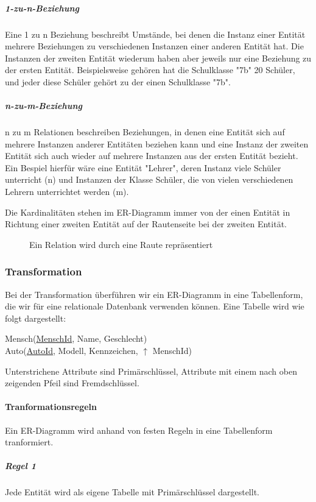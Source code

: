 \documentclass{article}
\begin{document}
	\subparagraph{1-zu-n-Beziehung}
	Eine 1 zu n Beziehung beschreibt Umstände, bei denen die Instanz einer Entität mehrere Beziehungen zu verschiedenen Instanzen einer anderen Entität hat. Die Instanzen der zweiten Entität wiederum haben aber jeweils nur eine Beziehung zu der ersten Entität. Beispielsweise gehören hat die Schulklasse "7b" 20 Schüler, und jeder diese Schüler gehört zu der einen Schulklasse "7b".

	\subparagraph{n-zu-m-Beziehung}
	n zu m Relationen beschreiben Beziehungen, in denen eine Entität sich auf mehrere Instanzen anderer Entitäten beziehen kann und eine Instanz der zweiten Entität sich auch wieder auf mehrere Instanzen aus der ersten Entität bezieht. Ein Bespiel hierfür wäre eine Entität "Lehrer", deren Instanz viele Schüler unterricht (n) und Instanzen der Klasse Schüler, die von vielen verschiedenen Lehrern unterrichtet werden (m).

	Die Kardinalitäten stehen im ER-Diagramm immer von der einen Entität in Richtung einer zweiten Entität auf der Rautenseite bei der zweiten Entität.

	\begin{figure}[h!]
		\centering
		
		\caption{Ein Relation wird durch eine Raute repräsentiert}
	\end{figure}

	\subsubsection{Transformation}
	Bei der Transformation überführen wir ein ER-Diagramm in eine Tabellenform, die wir für eine relationale Datenbank verwenden können.
	Eine Tabelle wird wie folgt dargestellt:
	\begin{center}
		Mensch(\underline{MenschId}, Name, Geschlecht) \\
		Auto(\underline{AutoId}, Modell, Kennzeichen, $\uparrow$ MenschId)
	\end{center}
	Unterstrichene Attribute sind Primärschlüssel, Attribute mit einem nach oben zeigenden Pfeil sind Fremdschlüssel.

	\paragraph{Tranformationsregeln}
	Ein ER-Diagramm wird anhand von festen Regeln in eine Tabellenform tranformiert.

	\subparagraph{Regel 1}
	Jede Entität wird als eigene Tabelle mit Primärschlüssel dargestellt.
\end{document}
